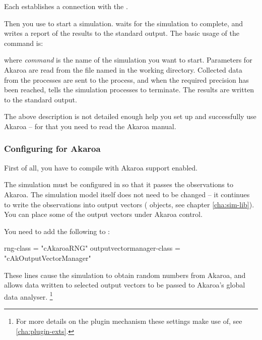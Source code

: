 Each  establishes a connection with the .

Then you use  to start a simulation.  waits
for the simulation to complete, and writes a report of the results
to the standard output. The basic usage of the  command is:


where \textit{command} is the name of the simulation you want to start.
Parameters for Akaroa are read from the file named  in
the working directory. Collected data from the processes are
sent to the  process, and when the required precision
has been reached,  tells the simulation processes to
terminate. The results are written to the standard output.

The above description is not detailed enough help you
set up and successfully use Akaroa -- for that you need to read the
Akaroa manual.

\subsubsection{Configuring {\opp} for Akaroa}
\label{sec:run-sim:configuring-akaroa}

First of all, you have to compile {\opp} with Akaroa support enabled.

The {\opp} simulation must be configured in 
so that it passes the observations to Akaroa. The simulation model itself does
not need to be changed -- it continues to write
the observations into output vectors ( objects,
see chapter \ref{cha:sim-lib}). You can place some of
the output vectors under Akaroa control.

You need to add the following to :

\begin{inifile}
[General]
rng-class = "cAkaroaRNG"
outputvectormanager-class = "cAkOutputVectorManager"
\end{inifile}

These lines cause the simulation to obtain random numbers from Akaroa,
and allows data written to selected output vectors to be passed to Akaroa's
global data analyser.
    \footnote{For more details on the plugin mechanism these settings make use of,
    see \ref{cha:plugin-exts}.}

